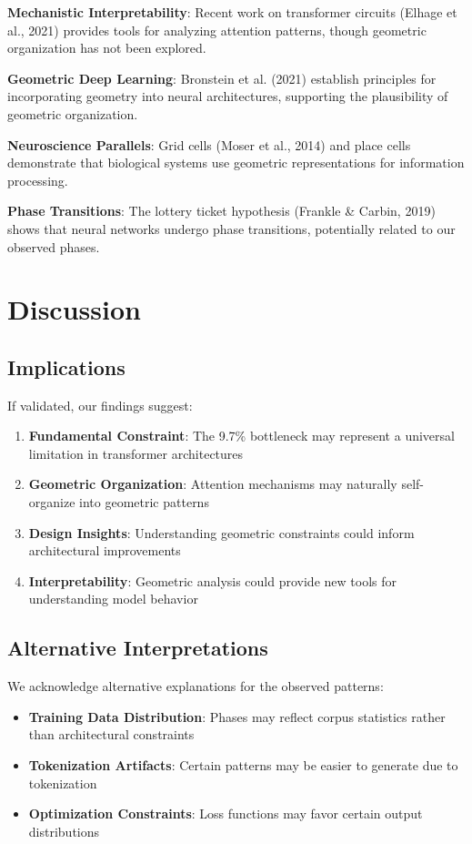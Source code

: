 \documentclass[pmlr,onecolumn]{jmlr}
\begin{document}
\textbf{Mechanistic Interpretability}: Recent work on transformer circuits (Elhage et al., 2021) provides tools for analyzing attention patterns, though geometric organization has not been explored.

\textbf{Geometric Deep Learning}: Bronstein et al. (2021) establish principles for incorporating geometry into neural architectures, supporting the plausibility of geometric organization.

\textbf{Neuroscience Parallels}: Grid cells (Moser et al., 2014) and place cells demonstrate that biological systems use geometric representations for information processing.

\textbf{Phase Transitions}: The lottery ticket hypothesis (Frankle \& Carbin, 2019) shows that neural networks undergo phase transitions, potentially related to our observed phases.

\section{Discussion}

\subsection{Implications}

If validated, our findings suggest:

\begin{enumerate}
\item \textbf{Fundamental Constraint}: The 9.7\% bottleneck may represent a universal limitation in transformer architectures
\item \textbf{Geometric Organization}: Attention mechanisms may naturally self-organize into geometric patterns
\item \textbf{Design Insights}: Understanding geometric constraints could inform architectural improvements
\item \textbf{Interpretability}: Geometric analysis could provide new tools for understanding model behavior
\end{enumerate}

\subsection{Alternative Interpretations}

We acknowledge alternative explanations for the observed patterns:

\begin{itemize}
\item \textbf{Training Data Distribution}: Phases may reflect corpus statistics rather than architectural constraints
\item \textbf{Tokenization Artifacts}: Certain patterns may be easier to generate due to tokenization
\item \textbf{Optimization Constraints}: Loss functions may favor certain output distributions
\end{itemize}
\end{document}

